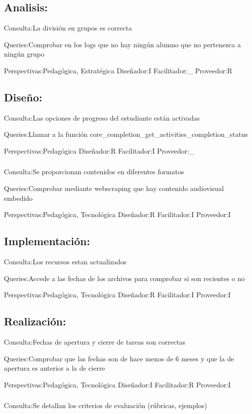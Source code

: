 \subsection{Analisis:} 
Consulta:La división en grupos es correcta 

Queries:Comprobar en los logs que no hay ningún alumno que no pertenezca a ningún grupo

Perspectivas:Pedagógica, Estratégica 
Diseñador:I Facilitador:\_ Proveedor:R

\subsection{Diseño:}
Consulta:Las opciones de progreso del estudiante están activadas

Queries:Llamar a la función core\_completion\_get\_activities\_completion\_status

Perspectivas:Pedagógica
Diseñador:R Facilitador:I Proveedor:\_
\subsubsection{}
Consulta:Se proporcionan contenidos en diferentes formatos

Queries:Comprobar mediante webscraping que hay contenido audiovisual embedido

Perspectivas:Pedagógica, Tecnológica 
Diseñador:R Facilitador:I Proveedor:I

\subsection{Implementación:}
Consulta:Los recursos estan actualizados

Queries:Accede a las fechas de los archivos para comprobar si son recientes o no

Perspectivas:Pedagógica, Tecnológica 
Diseñador:R Facilitador:I Proveedor:I

\subsection{Realización:}
Consulta:Fechas de apertura y cierre de tareas son correctas

Queries:Comprobar que las fechas son de hace menos de 6 meses y que la de apertura es anterior a la de cierre

Perspectivas:Pedagógica, Tecnológica 
Diseñador:I Facilitador:R Proveedor:I
\subsubsection{}
Consulta:Se detallan los criterios de evaluación (rúbricas, ejemplos)

